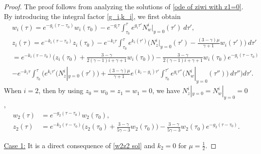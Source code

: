 \documentclass{article}
\newcommand{\ga}{\gamma}
\def\beqa{\begin{equation}\begin{aligned}}
\def\eeqa{\end{aligned}\end{equation}}
\numberwithin{equation}{section}
\begin{document}
    \begin{proof}
    The proof follows from analyzing the solutions of \eqref{ode of ziwi with z1=0}. 
    By introducing the integral factor \eqref{g_i,k_i},
    we first obtain  
  \beqa\label{eq 3.25}
        &w_i(\tau) =e^{-g_i(\tau-\tau_0)} w_i(\tau_0) -e^{-g_i\tau} \int_{\tau_0}^\tau e^{g_i\tau'} N_w^i|_{y=0}(\tau') \ d\tau',\\
         &z_i(\tau) = e^{-k_i(\tau-\tau_0)} z_i(\tau_0) -  e^{-k_i\tau} \int_{\tau_0}^\tau e^{k_i(\tau')}\Big( N_z^i|_{y=0}(\tau')-\frac{(3-\ga)\mu}{\ga+1} w_i(\tau') \Big) \ d\tau'\\
        &= e^{-k_i(\tau-\tau_0)} \Big(z_i(\tau_0) +\frac{3-\ga}{2(\ga-1)i+\ga+1} w_i(\tau_0) \Big) -\frac{3-\ga}{2(\ga-1)i+\ga+1} w_i(\tau_0)e^{-g_i(\tau-\tau_0)}\\
        & -e^{-k_i\tau} \int_{\tau_0}^\tau\Bigg( e^{k_i\tau'}\Big( N_z^i|_{y=0}(\tau')\Big) + \frac{(3-\ga)\mu}{\ga+1} e^{(k_i-g_i)\tau'}\int_{\tau_0}^{\tau'} e^{g_i\tau''} \Big(N_w^i|_{y=0}(\tau'')\Big) \ d\tau'' \Bigg)d \tau' .
  \eeqa
When $i=2$, then by using $z_0=w_0=z_1=w_1=0$, we have $N_z^i|_{y=0} =N_w^i|_{y=0}=0$,
  \beqa\label{w2z2 sol}
        w_2(\tau) &=  e^{-g_2(\tau-\tau_0)} w_2(\tau_0),\\
        z_2(\tau) &=e^{-k_2(\tau-\tau_0)} \Big(z_2(\tau_0) +\frac{3-\ga}{5\ga-3} w_2(\tau_0) \Big) -\frac{3-\ga}{5\ga-3} w_2(\tau_0)e^{-g_2(\tau-\tau_0)}.
    \eeqa


    \underline{Case 1:} It is a direct consequence of \eqref{w2z2 sol} and $k_2=0$ for $\mu=\frac12$. 



\end{proof}
\end{document}
